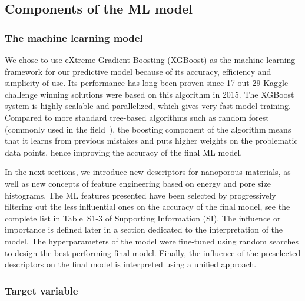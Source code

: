 \documentclass[main]{subfiles}
\begin{document}
\subsection{Components of the ML model}

\subsubsection{The machine learning model}

We chose to use eXtreme Gradient Boosting (XGBoost) as the machine learning framework for our predictive model because of its accuracy, efficiency and simplicity of use. Its performance has long been proven since 17 out 29 Kaggle challenge winning solutions were based on this algorithm in 2015. The XGBoost system is highly scalable and parallelized, which gives very fast model training.\autocite{chen2016xgboost} Compared to more standard tree-based algorithms such as random forest (commonly used in the field~\autocite{Simon_2015}), the boosting component of the algorithm means that it learns from previous mistakes and puts higher weights on the problematic data points, hence improving the accuracy of the final ML model.

In the next sections, we introduce new descriptors for nanoporous materials, as well as new concepts of feature engineering based on energy and pore size histograms. The ML features presented have been selected by progressively filtering out the less influential ones on the accuracy of the final model, see the complete list in Table~S1-3 of Supporting Information (SI). The influence or importance is defined later in a section dedicated to the interpretation of the model. The hyperparameters of the model were fine-tuned using random searches to design the best performing final model. Finally, the influence of the preselected descriptors on the final model is interpreted using a unified approach.

\subsubsection{Target variable}
\end{document}
